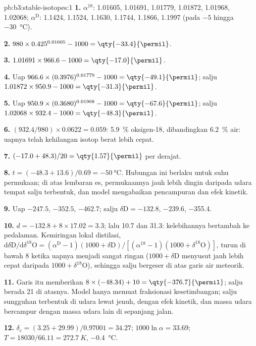 \begin{solution}{pb:b3:stable-isotopes:1}
\textbf{1.} $\alpha^{18}$: 1.01605, 1.01691, 1.01779, 1.01872, 1.01968,
1.02068; $\alpha^{\mathrm D}$: 1.1424, 1.1524, 1.1630, 1.1744, 1.1866, 1.1997
(pada $-5$ hingga \qty{-30}{\celsius}).

\textbf{2.} $980\times0.425^{0.01605} - 1000 = \qty{-33.4}{\permil}$.

\textbf{3.} $1.01691\times966.6 - 1000 = \qty{-17.0}{\permil}$.

\textbf{4.} Uap $966.6\times(0.3976)^{0.01779} - 1000 = \qty{-49.1}{\permil}$;
salju $1.01872\times950.9 - 1000 = \qty{-31.3}{\permil}$.

\textbf{5.} Uap $950.9\times(0.3680)^{0.01968} - 1000 = \qty{-67.6}{\permil}$;
salju $1.02068\times932.4 - 1000 = \qty{-48.3}{\permil}$.

\textbf{6.} $(932.4/980)\times0.0622 = 0.059$: \qty{5.9}{\percent} oksigen-18,
dibandingkan \qty{6.2}{\percent} air: uapnya telah kehilangan isotop berat
lebih cepat.

\textbf{7.} $(-17.0 + 48.3)/20 = \qty{1.57}{\permil}$ per derajat.

\textbf{8.} $t = (-48.3 + 13.6)/0.69 = \qty{-50}{\celsius}$. Hubungan ini
berlaku untuk suhu permukaan; di atas lembaran es, permukaannya jauh lebih dingin daripada
udara tempat salju terbentuk, dan model mengabaikan pencampuran dan efek kinetik.

\textbf{9.} Uap $-247.5$, $-352.5$, \qty{-462.7}{\permil}; salju $\delta\mathrm D
= -132.8$, $-239.6$, \qty{-355.4}{\permil}.

\textbf{10.} $d = -132.8 + 8\times17.02 = 3.3$; lalu 10.7 dan
\qty{31.3}{\permil}: kelebihannya bertambah ke pedalaman. Kemiringan lokal
distilasi, $\mathrm d\delta\mathrm D/\mathrm d\delta^{18}\mathrm O = (\alpha^{\mathrm D} -
1)(1000 + \delta\mathrm D)/[(\alpha^{18} - 1)(1000 + \delta^{18}\mathrm O)]$, turun di bawah
8 ketika uapnya menjadi sangat ringan ($1000 + \delta\mathrm D$ menyusut jauh lebih cepat daripada
$1000 + \delta^{18}\mathrm O$), sehingga salju bergeser di atas garis air meteorik.

\textbf{11.} Garis itu memberikan $8\times(-48.34) + 10 = \qty{-376.7}{\permil}$; salju
berada \qty{21}{\permil} di atasnya. Model hanya memuat fraksionasi
kesetimbangan; salju sungguhan terbentuk di udara lewat jenuh, dengan efek
kinetik, dan massa udara bercampur dengan massa udara lain di sepanjang jalan.

\textbf{12.} $\delta_c = (3.25 + 29.99)/0.97001 = 34.27$; $1000\ln\alpha =
33.69$; $T = 18030/66.11 = \qty{272.7}{K}$, \qty{-0.4}{\celsius}.


\end{solution}
